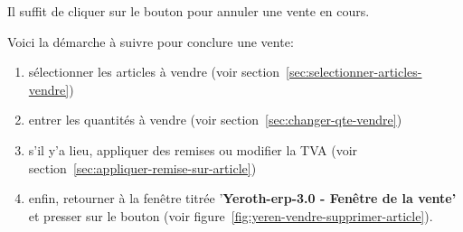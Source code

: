 

Il suffit de cliquer sur le bouton  pour annuler
une vente en cours.


\label{sec:conclure-une-vente}

Voici la d\'emarche \`a suivre pour conclure une vente:

\begin{enumerate}[1)]
	\item s\'electionner les articles \`a vendre
	(voir section~\ref{sec:selectionner-articles-vendre})
	
	\item entrer les quantit\'es \`a vendre 
	(voir section~\ref{sec:changer-qte-vendre})
	
	\item s'il y'a lieu, appliquer des remises ou modifier
	la TVA (voir section~\ref{sec:appliquer-remise-sur-article})
	
	\item enfin, retourner \`a la fen\^etre titr\'ee
	'\textbf{Yeroth-erp-3.0 - Fen\^etre de la vente'} et
	presser sur le bouton 
	(voir figure~\ref{fig:yeren-vendre-supprimer-article}).
\end{enumerate}


